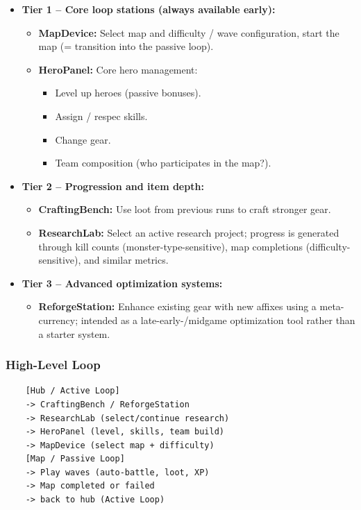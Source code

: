 \begin{itemize}
	\item \textbf{Tier 1 – Core loop stations (always available early):}
	\begin{itemize}
		\item \textbf{MapDevice:} Select map and difficulty / wave configuration, start the map (= transition into the passive loop).
		\item \textbf{HeroPanel:} Core hero management:
		\begin{itemize}
			\item Level up heroes (passive bonuses).
			\item Assign / respec skills.
			\item Change gear.
			\item Team composition (who participates in the map?).
		\end{itemize}
	\end{itemize}
	
	\item \textbf{Tier 2 – Progression and item depth:}
	\begin{itemize}
		\item \textbf{CraftingBench:} Use loot from previous runs to craft stronger gear.
		\item \textbf{ResearchLab:} Select an active research project; progress is generated through kill counts (monster-type-sensitive), map completions (difficulty-sensitive), and similar metrics.
	\end{itemize}
	
	\item \textbf{Tier 3 – Advanced optimization systems:}
	\begin{itemize}
		\item \textbf{ReforgeStation:} Enhance existing gear with new affixes using a meta-currency; intended as a late-early-/midgame optimization tool rather than a starter system.
	\end{itemize}
\end{itemize}

\subsubsection*{High-Level Loop}

\begin{verbatim}
	[Hub / Active Loop]
	-> CraftingBench / ReforgeStation
	-> ResearchLab (select/continue research)
	-> HeroPanel (level, skills, team build)
	-> MapDevice (select map + difficulty)
	[Map / Passive Loop]
	-> Play waves (auto-battle, loot, XP)
	-> Map completed or failed
	-> back to hub (Active Loop)
\end{verbatim}

